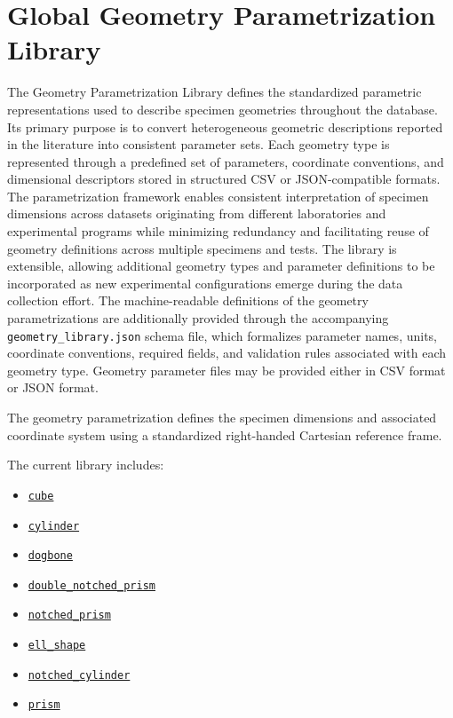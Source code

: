 \documentclass[11pt]{book}
\begin{document}
\section{Global Geometry Parametrization Library}
The Geometry Parametrization Library defines the standardized parametric representations used to describe specimen geometries throughout the database. Its primary purpose is to convert heterogeneous geometric descriptions reported in the literature into consistent parameter sets. Each
geometry type is represented through a predefined set of parameters, coordinate conventions, and dimensional descriptors stored in structured CSV or JSON-compatible formats. The parametrization framework enables consistent interpretation of specimen dimensions across datasets originating
from different laboratories and experimental programs while minimizing redundancy and facilitating reuse of geometry definitions across multiple specimens and tests. The library is extensible, allowing additional geometry types and parameter definitions to be incorporated as new experimental configurations emerge during the data collection effort. The machine-readable definitions of the geometry parametrizations are additionally provided through the accompanying \texttt{geometry\_library.json} schema file, which formalizes parameter names, units, coordinate conventions, required fields, and validation rules associated with each geometry type. Geometry parameter files may be provided either in CSV format or JSON format.

The geometry parametrization defines the specimen dimensions and associated coordinate system using a standardized right-handed Cartesian reference frame.



The current library includes: 
\begin{itemize}
    \item \hyperref[subsec:geometry_cube]{\texttt{cube}}
    \item \hyperref[subsec:geometry_cylinder]{\texttt{cylinder}}
        \item \hyperref[subsec:geometry_dogbone]{\texttt{dogbone}}
    \item \hyperref[subsec:geometry_double_notched_prism]{\texttt{double\_notched\_prism}}
    \item \hyperref[subsec:geometry_notched_prism]{\texttt{notched\_prism}}
    \item \hyperref[subsec:geometry_ell_shape]{\texttt{ell\_shape}}
    \item \hyperref[subsec:geometry_notched_cylinder]{\texttt{notched\_cylinder}}

    \item \hyperref[subsec:geometry_prism]{\texttt{prism}}
\end{itemize}
\end{document}
